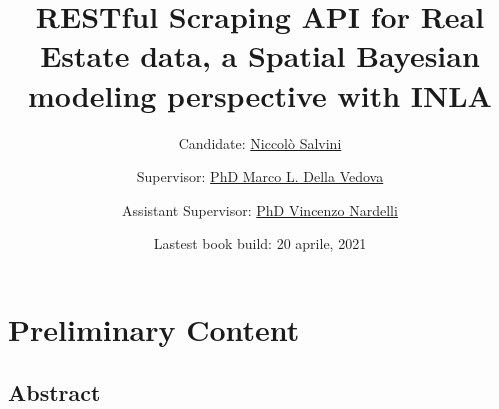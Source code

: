 \documentclass[
  12pt,
  a4paper,
  oneside]{book}
\title{RESTful Scraping API for Real Estate data, a Spatial Bayesian modeling perspective with INLA}
\author{Candidate: \href{https://niccolosalvini.netlify.app/}{Niccolò Salvini} \and Supervisor: \href{https://mldv.it/home/}{PhD Marco L. Della Vedova} \and Assistant Supervisor: \href{https://github.com/vincnardelli}{PhD Vincenzo Nardelli}}
\date{Lastest book build: 20 aprile, 2021}
\let\oldmaketitle\maketitle
\theoremstyle{definition}
\theoremstyle{definition}
\theoremstyle{definition}
\theoremstyle{remark}
\begin{document}
\maketitle


\newpage

\let\maketitle\oldmaketitle
\maketitle

{
\setcounter{tocdepth}{2}
\tableofcontents
}
\listoftables
\listoffigures
{}
\hypertarget{preliminary-content}{%
\chapter*{Preliminary Content}\label{preliminary-content}}

\hypertarget{abstract}{%
\section*{Abstract}\label{abstract}}
\end{document}
